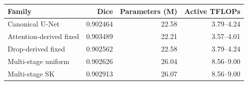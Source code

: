 \begin{tabular}{lrrr}
\toprule
Family & Dice & Parameters (M) & Active TFLOPs \\
\midrule
Canonical U-Net & 0.902464 & 22.58 & 3.79--4.24 \\
Attention-derived fixed & 0.903489 & 22.21 & 3.57--4.01 \\
Drop-derived fixed & 0.902562 & 22.58 & 3.79--4.24 \\
Multi-stage uniform & 0.902626 & 26.04 & 8.56--9.00 \\
Multi-stage SK & 0.902913 & 26.07 & 8.56--9.00 \\
\bottomrule
\end{tabular}
